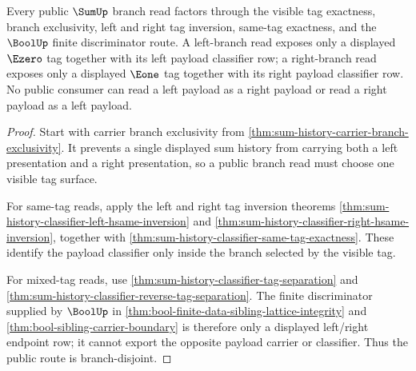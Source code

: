 \begin{theorem}
\label{thm:sum-branch-disjointness-public-route}
Every public $\SumUp$ branch read factors through the visible tag exactness,
branch exclusivity, left and right tag inversion, same-tag exactness, and the
$\BoolUp$ finite discriminator route. A left-branch read exposes only a
displayed $\Ezero$ tag together with its left payload classifier row; a
right-branch read exposes only a displayed $\Eone$ tag together with its right
payload classifier row. No public consumer can read a left payload as a right
payload or read a right payload as a left payload.
\end{theorem}
\begin{proof}
Start with carrier branch exclusivity from
\autoref{thm:sum-history-carrier-branch-exclusivity}. It prevents a single
displayed sum history from carrying both a left presentation and a right
presentation, so a public branch read must choose one visible tag surface.

For same-tag reads, apply the left and right tag inversion theorems
\autoref{thm:sum-history-classifier-left-hsame-inversion} and
\autoref{thm:sum-history-classifier-right-hsame-inversion}, together with
\autoref{thm:sum-history-classifier-same-tag-exactness}. These identify the
payload classifier only inside the branch selected by the visible tag.

For mixed-tag reads, use
\autoref{thm:sum-history-classifier-tag-separation} and
\autoref{thm:sum-history-classifier-reverse-tag-separation}. The finite
discriminator supplied by $\BoolUp$ in
\autoref{thm:bool-finite-data-sibling-lattice-integrity} and
\autoref{thm:bool-sibling-carrier-boundary} is therefore only a displayed
left/right endpoint row; it cannot export the opposite payload carrier or
classifier. Thus the public route is branch-disjoint.
\end{proof}
